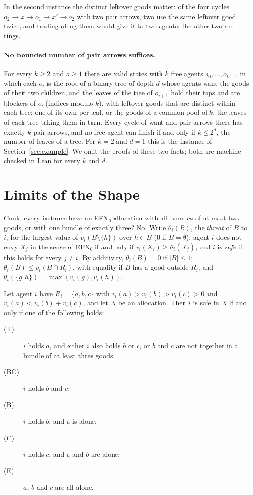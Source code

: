 \documentclass[runningheads,11pt]{llncs}
\newcommand{\efxz}{\texorpdfstring{\mbox{EFX$_0$}}{EFX0}}
\begin{document}
\noindent In the second instance the distinct leftover goods matter: of the four cycles $o_2\to x\to o_1\to x'\to o_2$ with two pair arrows, two use the same leftover good twice, and trading along them would give it to two agents; the other two are rings.

\paragraph{No bounded number of pair arrows suffices.} For every $k\ge2$ and $d\ge1$ there are valid states with $k$ free agents $o_0,\dots,o_{k-1}$ in which each $o_i$ is the root of a binary tree of depth $d$ whose agents want the goods of their two children, and the leaves of the tree of $o_{i+1}$ hold their tops and are blockers of $o_i$ (indices modulo $k$), with leftover goods that are distinct within each tree: one of its own per leaf, or the goods of a common pool of $k$, the leaves of each tree taking them in turn. Every cycle of want and pair arrows there has exactly $k$ pair arrows, and no free agent can finish if and only if $k\le2^d$, the number of leaves of a tree. For $k=2$ and $d=1$ this is the instance of Section~\ref{sec:example}. We omit the proofs of these two facts; both are machine-checked in Lean for every $k$ and $d$.

\section{Limits of the Shape}\label{app:limits}

Could every instance have an \efxz{} allocation with all bundles of at most two goods, or with one bundle of exactly three? No. Write $\theta_i(B)$, the \emph{threat} of $B$ to $i$, for the largest value of $v_i(B\setminus\{h\})$ over $h\in B$ ($0$ if $B=\emptyset$): agent $i$ does not envy $X_j$ in the sense of \efxz{} if and only if $v_i(X_i)\ge\theta_i(X_j)$, and $i$ is \emph{safe} if this holds for every $j\ne i$. By additivity, $\theta_i(B)=0$ if $|B|\le1$; $\theta_i(B)\le v_i(B\cap R_i)$, with equality if $B$ has a good outside $R_i$; and $\theta_i(\{g,h\})=\max(v_i(g),v_i(h))$.

\begin{lemma}\label{lem:L5}
Let agent $i$ have $R_i=\{a,b,c\}$ with $v_i(a)>v_i(b)>v_i(c)>0$ and $v_i(a)<v_i(b)+v_i(c)$, and let $X$ be an allocation. Then $i$ is safe in $X$ if and only if one of the following holds:
\begin{description}
\item[(T)] $i$ holds $a$, and either $i$ also holds $b$ or $c$, or $b$ and $c$ are not together in a bundle of at least three goods;
\item[(BC)] $i$ holds $b$ and $c$;
\item[(B)] $i$ holds $b$, and $a$ is alone;
\item[(C)] $i$ holds $c$, and $a$ and $b$ are alone;
\item[(E)] $a$, $b$ and $c$ are all alone.
\end{description}
\end{lemma}
\end{document}
